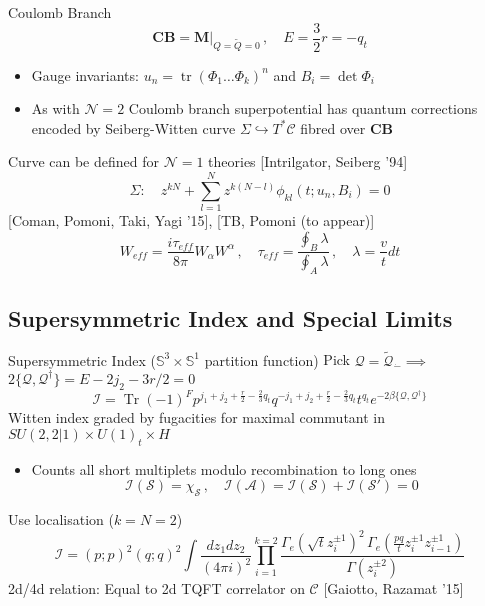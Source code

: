 \documentclass{beamer}
\DeclareMathOperator{\tr}{tr}
\DeclareMathOperator{\Tr}{Tr}
\begin{document}
\begin{frame}{Coulomb Branch}
   \begin{equation*}
\boxed{ \mathbf{CB}=\mathbf{M}|_{Q=\widetilde{Q}=0}\,,\quad E=\frac{3}{2}r=-q_t}
   \end{equation*}
   \begin{itemize}
    \item Gauge invariants: $u_n=\tr(\Phi_1\dots\Phi_k)^n$ and $B_i=\det \Phi_i$
       \item  As with $\mathcal{N}=2$ Coulomb branch superpotential has quantum corrections encoded by Seiberg-Witten curve $\Sigma\hookrightarrow T^*\mathcal{C}$ fibred over $\mathbf{CB}$
   \end{itemize}
  Curve can be defined for $\mathcal{N}=1$ theories \color{blue}[Intrilgator, Seiberg '94]\color{black}  
   \begin{equation*}
     \Sigma:\quad  z^{kN}+\sum_{l=1}^Nz^{k(N-l)}\phi_{kl}(t;u_n,B_i)=0
   \end{equation*}
   \color{blue}[Coman, Pomoni, Taki, Yagi '15]\color{black}, \color{blue} [TB, Pomoni (to appear)]\color{black}
   \begin{equation*}
       W_{eff}=\frac{i\tau_{eff}}{8\pi}W_{\alpha}W^{\alpha}\,,\quad \tau_{eff}=\frac{\oint_B\lambda}{\oint_A\lambda}\,,\quad \lambda=\frac{v}{t}dt
   \end{equation*}
\end{frame}
\subsection{Supersymmetric Index and Special Limits}
\begin{frame}{Supersymmetric Index ($\mathbb{S}^3\times \mathbb{S}^1$ partition function)}
Pick $\mathcal{Q}=\widetilde{\mathcal{Q}}_{\dot-}\implies$ $\boxed{2\{\mathcal{Q},\mathcal{Q}^{\dagger}\}=E-2j_2-3r/2=0}$
\begin{equation*}
    \mathcal{I}=\Tr (-1)^Fp^{j_1+j_2+\frac{r}{2}-\frac{2}{3}q_t}q^{-j_1+j_2+\frac{r}{2}-\frac{2}{3}q_t}t^{q_t}e^{-2\beta\{\mathcal{Q},\mathcal{Q}^{\dagger}\}}
\end{equation*}
Witten index graded by fugacities for maximal commutant in $SU(2,2|1)\times U(1)_t\times H$
\begin{itemize}
    \item{ Counts all short multiplets modulo recombination to long ones
    \begin{equation*}
    \mathcal{I}(\mathcal{S})=\chi_{\mathcal{S}}\,,\quad \mathcal{I}(\mathcal{A})=\mathcal{I}(\mathcal{S})+\mathcal{I}(\mathcal{S}')=0
\end{equation*}}
\end{itemize}

Use localisation ($k=N=2$)
\begin{equation*}
    \mathcal{I}=(p;p)^2(q;q)^2\int\frac{dz_1dz_2}{(4\pi i)^2}\prod_{i=1}^{k=2}\frac{\Gamma_e(\sqrt{t}z_i^{\pm1})^2\,\Gamma_e(\frac{pq}{t}z_i^{\pm1}z_{i-1}^{\pm1})}{\Gamma(z_i^{\pm2})}
\end{equation*}
2d/4d relation: Equal to 2d TQFT correlator on $\mathcal{C}$ \color{blue}[Gaiotto, Razamat '15]
\end{frame}
\end{document}
